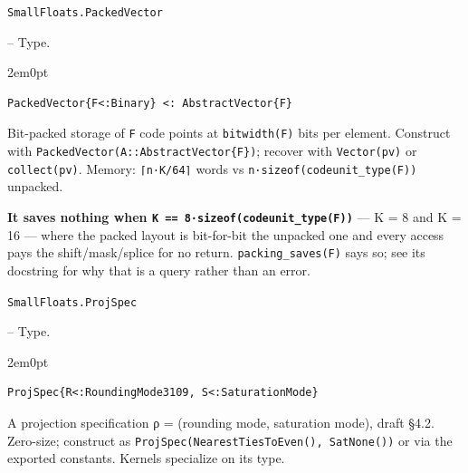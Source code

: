 \par\medskip\noindent\begin{minipage}{\linewidth}
\hypertarget{4163091736558650519}{\texttt{SmallFloats.PackedVector}}  -- {Type.}
\nopagebreak
\begin{adjustwidth}{2em}{0pt}


\begin{verbatim}
PackedVector{F<:Binary} <: AbstractVector{F}
\end{verbatim}

Bit-packed storage of \texttt{F} code points at \texttt{bitwidth(F)} bits per element. Construct with \texttt{PackedVector(A::AbstractVector\{F\})}; recover with \texttt{Vector(pv)} or \texttt{collect(pv)}. Memory: \texttt{⌈n·K/64⌉} words vs \texttt{n·sizeof(\allowbreak{}codeunit\_\allowbreak{}type(\allowbreak{}F))} unpacked.

\textbf{It saves nothing when \texttt{K == 8·sizeof(\allowbreak{}codeunit\_\allowbreak{}type(\allowbreak{}F))}} — K = 8 and K = 16 — where the packed layout is bit-for-bit the unpacked one and every access pays the shift/mask/splice for no return. \texttt{packing\_\allowbreak{}saves(F)} says so; see its docstring for why that is a query rather than an error.



\end{adjustwidth}
\end{minipage}
\par\medskip

\par\medskip\noindent\begin{minipage}{\linewidth}
\hypertarget{14580192752130828046}{\texttt{SmallFloats.ProjSpec}}  -- {Type.}
\nopagebreak
\begin{adjustwidth}{2em}{0pt}


\begin{verbatim}
ProjSpec{R<:RoundingMode3109, S<:SaturationMode}
\end{verbatim}

A projection specification ρ = (rounding mode, saturation mode), draft §4.2. Zero-size; construct as \texttt{ProjSpec(\allowbreak{}NearestTiesToEven(\allowbreak{}), SatNone(\allowbreak{}))} or via the exported constants. Kernels specialize on its type.



\end{adjustwidth}
\end{minipage}
\par\medskip

